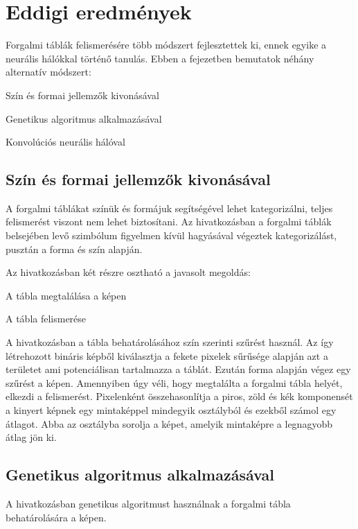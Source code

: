 \chapter{Eddigi eredmények}\label{ch:eredmenyek}

\begin{osszefoglal}


Forgalmi táblák felismerésére több módszert fejlesztettek ki, ennek egyike a neurális hálókkal történő tanulás. Ebben a fejezetben bemutatok néhány alternatív módszert:

\begin{compactenum}
  \item Szín és formai jellemzők kivonásával
  \item Genetikus algoritmus alkalmazásával
  \item Konvolúciós neurális hálóval
\end{compactenum}

\end{osszefoglal}



\section{Szín és formai jellemzők kivonásával}

A forgalmi táblákat színük és formájuk segítségével lehet kategorizálni, teljes felismerést viszont nem lehet biztosítani. Az \cite{1} hivatkozásban a forgalmi táblák belsejében levő szimbólum figyelmen kívül hagyásával végeztek kategorizálást, pusztán a forma és szín alapján. 

Az \cite{6} hivatkozásban két részre osztható a javasolt megoldás:
\begin{compactenum}
	\item A tábla megtalálása a képen
	\item A tábla felismerése
\end{compactenum}

A \cite{6} hivatkozásban a tábla behatárolásához szín szerinti szűrést használ. Az így létrehozott bináris képből kiválasztja a fekete pixelek sűrűsége alapján azt a területet ami potenciálisan tartalmazza a táblát. Ezután forma alapján végez egy szűrést a képen. Amennyiben úgy véli, hogy megtalálta a forgalmi tábla helyét, elkezdi a felismerést. Pixelenként összehasonlítja a piros, zöld és kék komponensét a kinyert képnek egy mintaképpel mindegyik osztályból és ezekből számol egy átlagot. Abba az osztályba sorolja a képet, amelyik mintaképre a legnagyobb átlag jön ki.

\section{Genetikus algoritmus alkalmazásával}

A \cite{16} hivatkozásban genetikus algoritmust használnak a forgalmi tábla behatárolására a képen. 